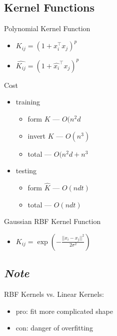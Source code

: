 \documentclass[10pt,landscape,a4paper]{article}
\begin{document}
\begin{multicols*}{5}
\subsection{Kernel Functions}
Polynomial Kernel Function
\begin{itemize}
    \item \(K_{ij} = (1+x_i^\intercal x_j)^p\)
    \item \(\hat{K_{ij}} = (1+\hat{x_i}^\intercal x_j)^p\)
\end{itemize}
Cost
\begin{itemize}
    \item training
    \begin{itemize}
        \item form \(K\) --- \(O(n^2d\)
        \item invert \(K\) --- \(O(n^3)\)
        \item total --- \(O(n^2d + n^3\)
    \end{itemize}
    \item testing
    \begin{itemize}
        \item form \(\hat{K}\) --- \(O(ndt)\)
        \item total --- \(O(ndt)\)
    \end{itemize}
\end{itemize}
Gaussian RBF Kernel Function
\begin{itemize}
    \item \(K_{ij} = \exp(- \frac{||x_i-x_j||^2}{2\sigma^2})\)
\end{itemize}

\subsection{\emph{Note}}
RBF Kernels vs. Linear Kernels:
\begin{itemize}
    \item pro: fit more complicated shape
    \item con: danger of overfitting
\end{itemize}


\end{multicols*}
\end{document}
